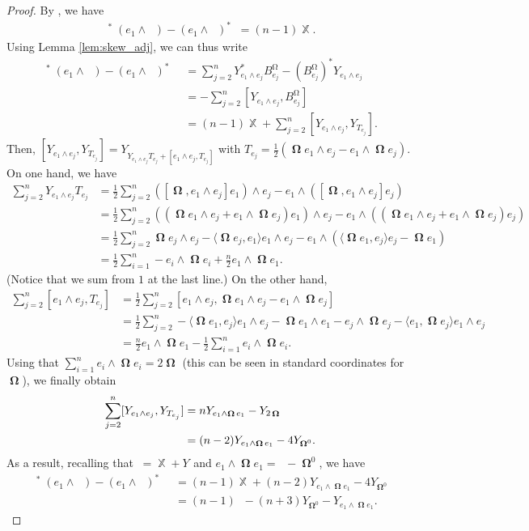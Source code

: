 \documentclass[12pt]{amsart}
\numberwithin{numbering}{section}
\theoremstyle{plain}
\theoremstyle{definition}
\theoremstyle{remark}
\numberwithin{equation}{section}
\DeclareMathOperator{\nv}{\nabla_{\mathbb{V}}}
\DeclareMathOperator{\nh}{\nabla_{\mathbb{H}}}
\DeclareMathOperator{\nhs}{\nabla_{\mathbb{H}^{\mg}}}
\DeclareMathOperator{\xx}{\mathbb{X}}
\DeclareMathOperator{\xs}{\mathbb{X}^{\mg}}
\DeclareMathOperator{\oo}{\mathbf{\Omega}}
\DeclareMathOperator{\ot}{\widetilde{\mathbf{\Omega}}}
\DeclareMathOperator{\mg}{\Omega}
\begin{document}
\begin{proof}
By \cite[Lemma 2.5]{cekic2025pestov}, we have 
\begin{align*}
\nv^* (e_1 \wedge \nh) - (e_1 \wedge \nh)^* \nv = (n-1) \xx. 
\end{align*}
Using Lemma \ref{lem:skew_adj}, we can thus write
\begin{align*}
\nv^* (e_1 \wedge \nhs) - (e_1 \wedge \nhs)^* \nv
&= \sum_{j=2}^n Y_{e_1 \wedge e_j}^* B_{e_j}^{\mg} - (B_{e_j}^{\mg})^* Y_{e_1 \wedge e_j} \\ 
&= - \sum_{j=2}^n [Y_{e_1 \wedge e_j}, B_{e_j}^{\mg}] \\ 
&= (n-1) \xx + \sum_{j=2}^n [Y_{e_1 \wedge e_j}, Y_{T_{e_j}}].
\end{align*}
Then, $[Y_{e_1 \wedge e_j}, Y_{T_{e_j}}] = Y_{Y_{e_1 \wedge e_j} T_{e_j} + [e_1 \wedge e_j, T_{e_j}]}$ with $T_{e_j} = \frac{1}{2} (\oo e_1 \wedge e_j - e_1 \wedge \oo e_j)$. On one hand, we have 
\begin{align*}
\sum_{j=2}^n Y_{e_1 \wedge e_j} T_{e_j} 
&= \frac{1}{2} \sum_{j=2}^n ([\oo, e_1 \wedge e_j] e_1) \wedge e_j - e_1 \wedge ([\oo, e_1 \wedge e_j] e_j) \\ 
&= \frac{1}{2} \sum_{j=2}^n ((\oo e_1 \wedge e_j + e_1 \wedge \oo e_j) e_1) \wedge e_j - e_1 \wedge ((\oo e_1 \wedge e_j + e_1 \wedge \oo e_j) e_j) \\ 
&= \frac{1}{2} \sum_{j=2}^n \oo e_j \wedge e_j - \langle \oo e_j, e_1 \rangle e_1 \wedge e_j - e_1 \wedge (\langle \oo e_1, e_j \rangle e_j - \oo e_1) \\ 
&= \frac{1}{2} \sum_{i=1}^n - e_i \wedge \oo e_i + \frac{n}{2} e_1 \wedge \oo e_1.
\end{align*}
(Notice that we sum from $1$ at the last line.) On the other hand, 
\begin{align*}
\sum_{j=2}^n [e_1 \wedge e_j, T_{e_j}] 
&= \frac{1}{2} \sum_{j=2}^n [e_1 \wedge e_j, \oo e_1 \wedge e_j - e_1 \wedge \oo e_j] \\ 
&= \frac{1}{2} \sum_{j=2}^n - \langle \oo e_1, e_j \rangle e_1 \wedge e_j - \oo e_1 \wedge e_1 - e_j \wedge \oo e_j - \langle e_1, \oo e_j \rangle e_1 \wedge e_j \\ 
&= \frac{n}{2} e_1 \wedge \oo e_1 - \frac{1}{2} \sum_{i=1}^n e_i \wedge \oo e_i.
\end{align*}
Using that $\sum_{i=1}^n e_i \wedge \oo e_i = 2 \oo$ (this can be seen in standard coordinates for $\oo$), we finally obtain
\begin{align} \label{eq:skew_adjoint_part}
\sum_{j=2}^n [Y_{e_1 \wedge e_j}, Y_{T_{e_j}}]
&= n Y_{e_1 \wedge \oo e_1} - Y_{2 \oo} \\ 
&= (n - 2) Y_{e_1 \wedge \oo e_1} - 4 Y_{\oo^0}. \notag
\end{align}
As a result, recalling that$\xs = \xx + Y_{\ot}$ and $e_1 \wedge \oo e_1 = \ot - \oo^0$, we have 
\begin{align*}
\nv^* (e_1 \wedge \nhs) - (e_1 \wedge \nhs)^* \nv 
& = (n-1) \xx + (n - 2) Y_{e_1 \wedge \oo e_1} - 4 Y_{\oo^0}\\ 
& = (n-1) \xs - (n+3) Y_{\oo^0} - Y_{e_1 \wedge \oo e_1}.
\end{align*}
\end{proof}
\end{document}
